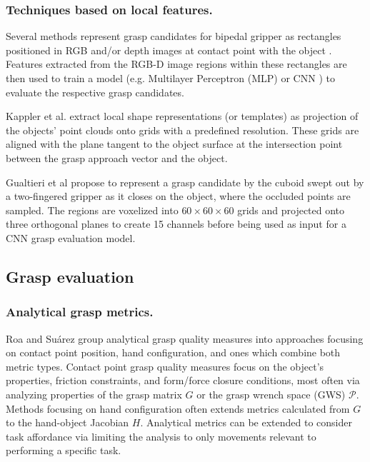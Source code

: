 \documentclass[runningheads]{../llncs}
\begin{document}
\subsubsection*{Techniques based on local features.}

Several methods represent grasp candidates for bipedal gripper as rectangles positioned in RGB and/or depth images at
contact point with the object \cite{jiang2011,Detry2012,lenz2015}. Features extracted from the RGB-D image regions
within these rectangles are then used to train a model (e.g. Multilayer Perceptron (MLP) \cite{lenz2015} or CNN
\cite{jiang2011}) to evaluate the respective grasp candidates.

Kappler et al. \cite{Kappler2015} extract local shape representations (or templates) as projection of the objects'
point clouds onto grids with a predefined resolution. These grids are aligned with the plane tangent to the object
surface at the intersection point between the grasp approach vector and the object.

Gualtieri et al \cite{Gualtieri2016} propose to represent a grasp candidate by the cuboid swept out by a two-fingered
gripper as it closes on the object, where the occluded points are sampled. The regions are voxelized into $60 \times 60
\times 60$ grids and projected onto three orthogonal planes to create 15 channels before being used as input for a CNN
grasp evaluation model.

\subsection{Grasp evaluation}

\subsubsection*{Analytical grasp metrics.}

Roa and Su{\'a}rez \cite{Roa2015} group analytical grasp quality measures into approaches focusing on contact point
position, hand configuration, and ones which combine both metric types. Contact point grasp quality measures focus on
the object's properties, friction constraints, and form/force closure conditions, most often via analyzing properties
of the grasp matrix $ G $ or the grasp wrench space (GWS) $ \mathcal{P} $. Methods focusing on hand configuration often
extends metrics calculated from $ G $ to the hand-object Jacobian $ H $. Analytical metrics can be extended to consider
task affordance via limiting the analysis to only movements relevant to performing a specific task.
\end{document}
